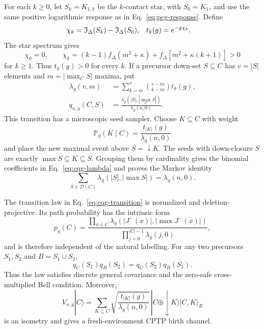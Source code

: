 For each \(k\geq0\), let \(S_k=K_{1,k}\) be the \(k\)-contact star, with
\(S_0=K_1\), and use the same positive logarithmic response as in
Eq.~\eqref{eq:pcg-response}.  Define
\begin{align}
 \chi_k&=\mathfrak I_\Delta(S_k)-\mathfrak I_\Delta(S_0),&
 t_k(g)&=e^{-g\chi_k}.
 \label{eq:cqg-contact-couplings}
\end{align}
The star spectrum gives
\begin{equation}
 \chi_0=0,\qquad
 \chi_k=(k-1)f_\Delta(m^2+\kappa)
 +f_\Delta[m^2+\kappa(k+1)]>0
 \label{eq:cqg-star-response}
\end{equation}
for \(k\geq1\).  Thus \(t_k(g)>0\) for every \(k\).  If a precursor
down-set \(S\subseteq C\) has \(v=|S|\) elements and \(m=|\max_C S|\)
maxima, put
\begin{align}
 \lambda_g(v,m)
 &=\sum_{k=m}^{v}\binom{v-m}{k-m}t_k(g),\label{eq:cqg-lambda}\\
 q_{n,g}(C,S)
 &=\frac{\lambda_g(|S|,|\max_C S|)}{\lambda_g(n,0)}.
 \label{eq:cqg-transition}
\end{align}
This transition has a microscopic seed sampler.  Choose
\(K\subseteq C\) with weight
\begin{equation}
 \mathbb P_g(K\mid C)=\frac{t_{|K|}(g)}{\lambda_g(n,0)}
 \label{eq:cqg-seed}
\end{equation}
and place the new maximal event above \(S=\downarrow K\).  The seeds with
down-closure \(S\) are exactly
\(\max S\subseteq K\subseteq S\).  Grouping them by cardinality gives the
binomial coefficients in Eq.~\eqref{eq:cqg-lambda} and proves the Markov
identity
\begin{equation}
 \sum_{S\in\mathcal D(C)}
 \lambda_g(|S|,|\max S|)=\lambda_g(n,0).
 \label{eq:cqg-markov}
\end{equation}

\begin{theorem}
\label{thm:cqg-positive-growth}
The transition law in Eq.~\eqref{eq:cqg-transition} is normalized and
deletion-projective.  Its path probability has the intrinsic form
\begin{equation}
 p_g(C)=
 \frac{\displaystyle\prod_{x\in C}
 \lambda_g(|J^-(x)|,|\max J^-(x)|)}
 {\displaystyle\prod_{j=0}^{|C|-1}\lambda_g(j,0)},
 \label{eq:cqg-intrinsic-path}
\end{equation}
and is therefore independent of the natural labelling.  For any two
precursors \(S_1,S_2\) and \(B=S_1\cup S_2\),
\begin{equation}
 q_C(S_1)q_B(S_2)=q_C(S_2)q_B(S_1).
 \label{eq:cqg-bell}
\end{equation}
Thus the law satisfies discrete general covariance and the zero-safe
cross-multiplied Bell condition.  Moreover,
\begin{equation}
 V_{n,g}|C\rangle=
 \sum_{K\subseteq C}
 \sqrt{\frac{t_{|K|}(g)}{\lambda_g(n,0)}}\,
 |C\oplus\downarrow K\rangle|C,K\rangle_E
 \label{eq:cqg-isometry}
\end{equation}
is an isometry and gives a fresh-environment CPTP birth channel.
\end{theorem}

